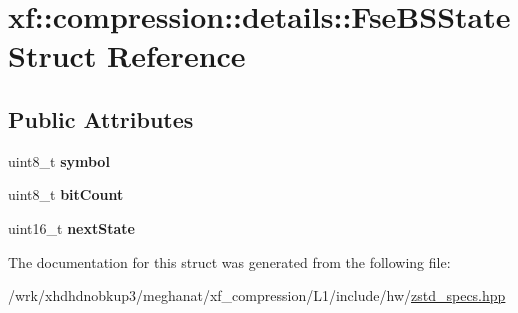 \hypertarget{structxf_1_1compression_1_1details_1_1FseBSState}{\section{xf\-:\-:compression\-:\-:details\-:\-:Fse\-B\-S\-State Struct Reference}
\label{structxf_1_1compression_1_1details_1_1FseBSState}
}
\subsection*{Public Attributes}
\begin{DoxyCompactItemize}
\item 
\hypertarget{structxf_1_1compression_1_1details_1_1FseBSState_a9d488289f66782dd34b217c4bd0e69f3}{uint8\-\_\-t {\bfseries symbol}}\label{structxf_1_1compression_1_1details_1_1FseBSState_a9d488289f66782dd34b217c4bd0e69f3}

\item 
\hypertarget{structxf_1_1compression_1_1details_1_1FseBSState_a8684516bd49a1fbcf9472100e044648c}{uint8\-\_\-t {\bfseries bit\-Count}}\label{structxf_1_1compression_1_1details_1_1FseBSState_a8684516bd49a1fbcf9472100e044648c}

\item 
\hypertarget{structxf_1_1compression_1_1details_1_1FseBSState_aeb57ea51030f2185be44284aa5d0e045}{uint16\-\_\-t {\bfseries next\-State}}\label{structxf_1_1compression_1_1details_1_1FseBSState_aeb57ea51030f2185be44284aa5d0e045}

\end{DoxyCompactItemize}


The documentation for this struct was generated from the following file\-:\begin{DoxyCompactItemize}
\item 
/wrk/xhdhdnobkup3/meghanat/xf\-\_\-compression/\-L1/include/hw/\hyperlink{zstd__specs_8hpp}{zstd\-\_\-specs.\-hpp}\end{DoxyCompactItemize}
